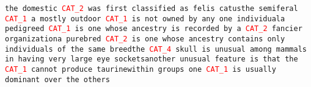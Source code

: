 \texttt{the domestic \textcolor{red}{CAT\_2} was first classified as felis catus\newline the semiferal \textcolor{red}{CAT\_1} a mostly outdoor \textcolor{red}{CAT\_1} is not owned by any one individual\newline a pedigreed \textcolor{red}{CAT\_1} is one whose ancestry is recorded by a \textcolor{red}{CAT\_2} fancier organization\newline a purebred \textcolor{red}{CAT\_2} is one whose ancestry contains only individuals of the same breed\newline the \textcolor{red}{CAT\_4} skull is unusual among mammals in having very large eye sockets\newline another unusual feature is that the \textcolor{red}{CAT\_1} cannot produce taurine\newline within groups one \textcolor{red}{CAT\_1} is usually dominant over the others}
